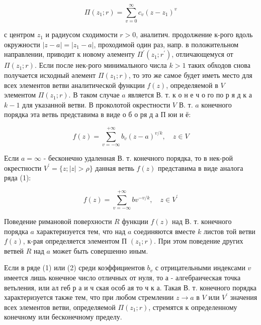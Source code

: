 \documentclass[10pt]{article}
\begin{document}
\[

\Pi\left(z_{1} ; r\right)=\sum_{v=0}^{\infty} c_{v}\left(z-z_{1}\right)^{v}

\]



с центром $z_{1}$ и радиусом сходимости $r>0$, аналитич. продолжение к-рого вдоль окружности $|z-a|=\left|z_{1}-a\right|$, проходимой один раз, напр. в положительном направлении, приводит к новому әлементу $\Pi^{\prime}\left(z_{1} ; r^{\prime}\right)$, отличающемуся от $\Pi\left(z_{1} ; r\right)$. Если после нек-рого минимального числа $k>1$ таких обходов снова получается исходный әлемент $\Pi\left(z_{1} ; r\right)$, то это же самое будет иметь место для всех элементов ветви аналитической функции $f(z)$, определяемой в $V$ элементом $\Pi\left(z_{1} ; r\right)$. В таком случае $a$ является В. т. к о н е ч о го по р я д к а $k-1$ для указанной ветви. В проколотой окрестности $V$ В. т. $a$ конечного порядка эта ветвь представима в виде о б о ря д а П юи и ё:



\[

f(z)=\sum_{v=-\infty}^{+\infty} b_{v}(z-a)^{v / k}, \quad z \in V

\]



Если $a=\infty$ - бесконечно удаленная В. т. конечного порядка, то в нек-рой окрестности $V^{\prime}=\{z ;|z|>\rho\}$ данная ветвь $f(z)$ представима в виде аналога ряда (1):



\[

f(z)=\sum_{v=-\infty}^{+\infty} b v^{-v / k}, \quad z \in V^{\prime}

\]



Поведение римановой поверхности $R$ функции $f(z)$ над В. т. конечного порядка $a$ характеризуется тем, что над $a$ соединяются вместе $k$ листов той ветви $f(z)$, к-рая определяется элементом П $\left(z_{1} ; r\right)$. При этом поведение других ветвей $R$ над $a$ может быть совершенно иным.



Если в ряде (1) или (2) среди коэффициентов $b_{v}$ с отрицательными индексами $v$ имеется лишь конечное число отличных от нуля, то $а$ - алгебраическая точка ветьления, или ал геб р а и ч ская особ ая то ч к а. Такая В. т. конечного порядка характеризуется также тем, что при любом стремлении $z \rightarrow a$ в $V$ или $V^{\prime}$ значения всех элементов ветви, определяемой $\Pi\left(z_{1} ; r\right)$, стремятся к определенному конечному или бесконечному пределу.
\end{document}

